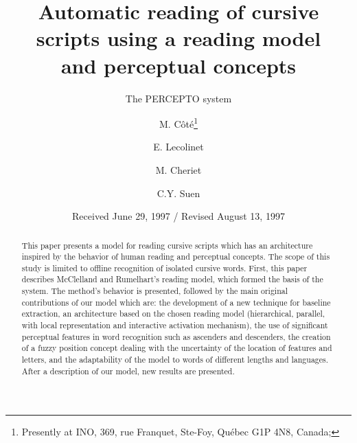 \documentclass[ijdar]{svjour}
\begin{document}
\def\bsub#1{\def\theequation{#1\alph{equation}}\setcounter{equation}{0}}
\def\esub#1{\def\theequation{\arabic{equation}}\setcounter{equation}{#1}}


\def\subsubsection#1{\paragraph{\it #1}}

\title{Automatic reading of cursive scripts using a reading model\\ and
perceptual concepts}

\subtitle{The PERCEPTO system}

\author{M. C\^{o}t\'{e}\fnmsep\thanks{Presently at
INO, 369, rue Franquet, Ste-Foy,
Qu\'{e}bec G1P 4N8, Canada; }
\and
E. Lecolinet \and M. Cheriet \and C.Y. Suen}




\date{Received June 29, 1997 / Revised August 13, 1997}


\maketitle

\begin{abstract} This paper presents a model for reading cursive scripts
which has an architecture inspired by the behavior of human reading and
perceptual concepts. The scope of this study is limited to offline
recognition of isolated cursive words. First, this paper describes
McClelland and Rumelhart's reading model, which formed the basis of the
system. The method's behavior is presented, followed by the main
original contributions of our model which are: the development of a new
technique for baseline extraction, an architecture based on the chosen
reading model (hierarchical, parallel, with local representation and
interactive activation mechanism), the use of significant perceptual
features in word recognition such as ascenders and descenders, the
creation of a fuzzy position concept dealing with the uncertainty of the
location of features and letters, and the adaptability of the model to
words of different lengths and languages. After a description of our
model, new results are presented.

\end{abstract}
\end{document}
